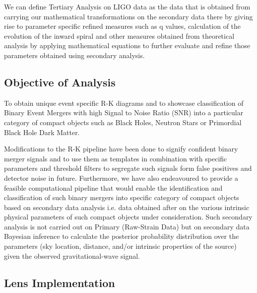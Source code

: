     We can define Tertiary Analysis on LIGO data as the data that is obtained from carrying our mathematical transformations on the secondary data there by giving rise to parameter specific refined measures such as q values, calculation of the evolution of the inward spiral and other measures obtained from theoretical analysis by applying mathematical equations to further evaluate and refine those parameters obtained using secondary analysis.

    \subsection{Objective of Analysis}

    To obtain unique event specific R-K diagrams and to showcase classification of Binary Event Mergers with high Signal to Noise Ratio (SNR) into a particular category of compact objects such as Black Holes, Neutron Stars or Primordial Black Hole Dark Matter.

    Modifications to the R-K pipeline have been done to signify confident binary merger signals and to use them as templates in combination with specific parameters and threshold filters to segregate such signals form false positives and detector noise in future. Furthermore, we have also endeavoured to provide a feasible computational pipeline that would enable the identification and classification of such binary mergers into specific category of compact objects based on secondary data analysis i.e. data obtained after on the various intrinsic physical parameters of such compact objects under consideration. Such secondary analysis is not carried out on Primary (Raw-Strain Data) but on secondary data Bayesian inference to calculate the posterior probability distribution over the parameters (sky location, distance, and/or intrinsic properties of the source) given the observed gravitational-wave signal.

    \subsection{Lens Implementation}

